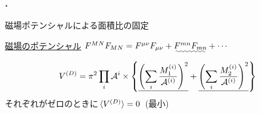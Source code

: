 \documentclass[aspectratio=169,
  a4paper,uplatex,dvipdfmx,11pt,
  xcolor = {dvipsnames,svgnames},
  hyperref ={colorlinks=true,citecolor=Navy,linkcolor=NavyBlue,urlcolor=purple}
]{beamer}
\begin{document}
\begin{frame}
  \frametitle{\thesection.\ \secname}

  \begin{bluebox}{\empty}
    \centering
    磁場ポテンシャルによる面積比の固定
  \end{bluebox}

  \uline{磁場のポテンシャル}\qquad 
  $
    F^{MN}F_{MN}
    =
    F^{\mu\nu}F_{\mu\nu}
    +
    \uwave{F^{mn}F_{mn}}
    +
    \cdots
  $
  \\
  \hspace*{9cm}{\Large $\downarrow$}
  \begin{equation}
    V^{(D)}
    =
    \pi^2
    \prod_{i}\mathcal{A}^{i}
    \times
    \left\{
      \uline{
      \left(  
        \sum_{i}\frac{M_{1}^{(i)}}{\mathcal{A}^{(i)}}
      \right)^2
      }
      +
      \uline{
      \left( 
        \sum_{i}\frac{M_{2}^{(i)}}{\mathcal{A}^{(i)}}
      \right)^2
      }
    \right\}
    \nonumber
  \end{equation}
  \hspace*{6.2cm}
  それぞれがゼロのときに$\ev*{V^{(D)}}=0$\ (最小)

  \begin{center}
  \end{center}

\end{frame}
\end{document}

